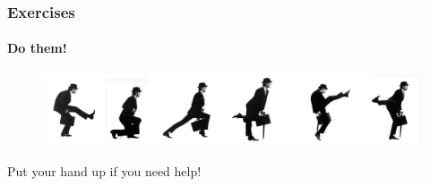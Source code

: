 \documentclass[handout]{beamer}
\begin{document}
\begin{frame}


\frametitle{Exercises}
\framesubtitle{Do them!}
\huge
\begin{figure}
\includegraphics[scale=0.3]{Ministry_of_Silly_walks_2012.jpg}
\end{figure}
 \vfill

\centering Put your hand up if you need help!

\end{frame}
\end{document}
